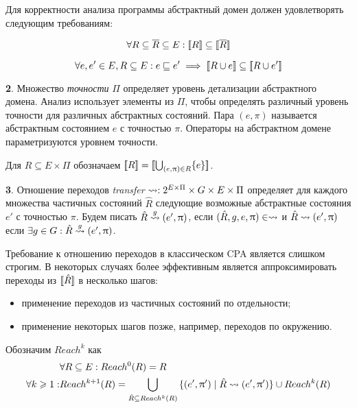 Для корректности анализа программы абстрактный домен должен удовлетворять следующим требованиям:

\begin{equation}
\label{cpa_conc_eq_0}
\forall R \subseteq \overline{R} \subseteq E: [\![ R ]\!] \subseteq [\![ \overline R ]\!]
\end{equation}

\begin{equation}
\label{cpa_conc_eq_2}
\forall e, e' \in E, R \subseteq E : e \sqsubseteq e' \implies [\![ R \cup e ]\!] \subseteq [\![ R \cup e' ]\!]
\end{equation}

{\textbf 2.} Множество \emph{точности} $\Pi$ определяет уровень детализации абстрактного домена. Анализ использует элементы из $\Pi$, чтобы определять различный уровень точности для различных абстрактных состояний.
Пара $(e, \pi)$ называется абстрактным состоянием $e$ с точностью $\pi$.
Операторы на абстрактном домене параметризуются уровнем точности.

Для $R \subseteq E \times \Pi$ обозначаем
$[\![ R ]\!] = [\![ \bigcup_{(e,\uppi)\in R}\{e\} ]\!]$.

{\textbf 3.} Отношение переходов \emph{transfer} $\leadsto: 2^{E\times \Pi} \times G \times E \times \Pi$ определяет для каждого множества частичных состояний $\hat R$ следующие возможные абстрактные состояния $e'$ с точностью $\pi$.
Будем писать $\hat R \stackrel{g}{\leadsto} (e', \uppi)$, если $(\hat R, g, e, \uppi) \in \leadsto$ и $\hat R \leadsto (e', \uppi)$ если $\exists g \in G: \hat R \stackrel{g}{\leadsto} (e', \uppi)$.


Требование к отношению переходов в классическом CPA является слишком строгим.
В некоторых случаях более эффективным является аппроксимировать переходы из $[\![ \hat R ]\!]$  в несколько шагов:
\begin{itemize}
\item применение переходов из частичных состояний по отдельности;
\item применение некоторых шагов позже, например, переходов по окружению.
\end{itemize}

Обозначим $Reach^k$ как
\begin{equation}
\label{reach_k}
\begin{aligned}
& \forall R \subseteq E: Reach^0(R) = R \\
\forall k\geqslant 1:& Reach^{k+1}(R) = \bigcup_{\hat R \subseteq Reach^{k}(R)}{\{(e',\uppi') \mid \hat R \leadsto (e',\uppi')\}} \cup Reach^{k}(R) \\
\end{aligned}
\end{equation}

